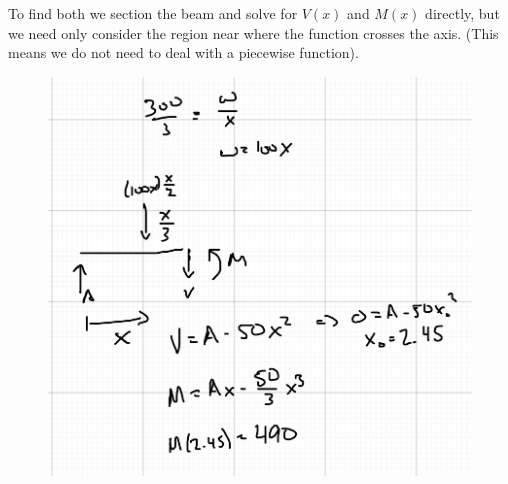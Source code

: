 \documentclass[12pt, oneside]{article}
\begin{document}
\begin{enumerate}
\begin{itemize}
				To find both we section the beam and solve for $V(x)$ and $M(x)$ directly, but we need only consider the region near where the function crosses the axis.
				(This means we do not need to deal with a piecewise function).
				\begin{figure}[H]
					\centering
					\includegraphics[width=0.6\linewidth]{5-2c}
				\end{figure}
		\end{itemize}


\end{enumerate}
\end{document}

